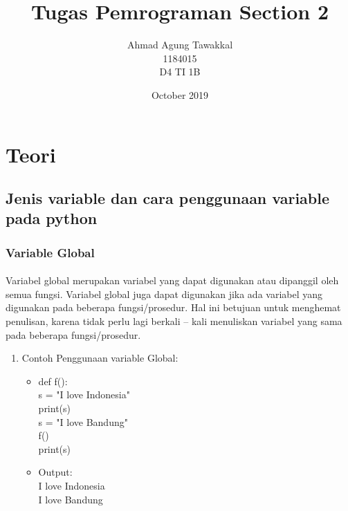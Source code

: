 \documentclass{article}
\title{Tugas Pemrograman Section 2}
\author{Ahmad Agung Tawakkal\\1184015\\D4 TI 1B}
\date{October 2019}
\begin{document}
\maketitle

\newpage

\section{Teori}
    
    \subsection{Jenis variable dan cara penggunaan variable pada python}
        \subsubsection{Variable Global}
            \paragraph{}Variabel global merupakan variabel yang dapat digunakan atau dipanggil oleh semua fungsi. Variabel global juga dapat digunakan jika ada variabel yang digunakan pada beberapa fungsi/prosedur. Hal ini betujuan untuk menghemat penulisan, karena tidak perlu lagi berkali – kali menuliskan variabel yang sama pada beberapa fungsi/prosedur.
                \begin{enumerate}
                    \item Contoh Penggunaan variable Global:
                        \begin{itemize}
                        \item def f(): \\
                                s = "I love Indonesia"\\
                                print(s) \\
                                s = "I love Bandung" \\
                                f()\\
                                print(s)
                        \item Output:\\ 
                                I love Indonesia\\ 
                                I love Bandung
                        \end{itemize}
                \end{enumerate}
\end{document}
